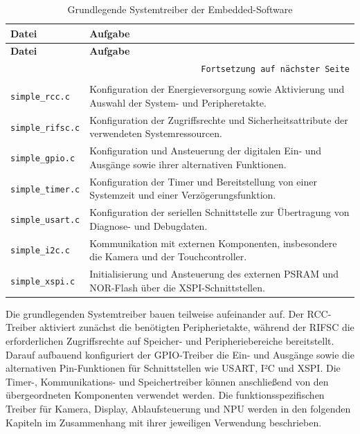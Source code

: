 \begin{longtable}{|p{}|p{}|}
    \hline
    \textbf{Datei} & \textbf{Aufgabe} \\
    \hline
    \endfirsthead
    \hline
    \textbf{Datei} & \textbf{Aufgabe} \\
    \hline
    \endhead
    \hline
    \multicolumn{2}{r}{\texttt{Fortsetzung auf nächster Seite}} \\
    \endfoot
    \caption{Grundlegende Systemtreiber der Embedded-Software}
    \label{tab:systemtreiber} \\
    \endlastfoot
    \texttt{simple\_rcc.c}   & Konfiguration der Energieversorgung sowie Aktivierung und Auswahl der System- und Peripheretakte. \\
    \hline
    \texttt{simple\_rifsc.c} & Konfiguration der Zugriffsrechte und Sicherheitsattribute der verwendeten Systemressourcen. \\
    \hline
    \texttt{simple\_gpio.c}  & Konfiguration und Ansteuerung der digitalen Ein- und Ausgänge sowie ihrer alternativen Funktionen. \\
    \hline
    \texttt{simple\_timer.c} & Konfiguration der Timer und Bereitstellung von einer Systemzeit und einer Verzögerungsfunktion. \\
    \hline
    \texttt{simple\_usart.c} & Konfiguration der seriellen Schnittstelle zur Übertragung von Diagnose- und Debugdaten. \\
    \hline
    \texttt{simple\_i2c.c}   & Kommunikation mit externen Komponenten, insbesondere die Kamera und der Touchcontroller. \\
    \hline
    \texttt{simple\_xspi.c}  & Initialisierung und Ansteuerung des externen PSRAM und NOR-Flash über die XSPI-Schnittstellen. \\
    \hline
\end{longtable}

Die grundlegenden Systemtreiber bauen teilweise aufeinander auf. Der RCC-Treiber aktiviert zunächst die benötigten Peripherietakte, während der RIFSC die erforderlichen Zugriffsrechte auf Speicher- und Peripheriebereiche bereitstellt. Darauf aufbauend konfiguriert der GPIO-Treiber die Ein- und Ausgänge sowie die alternativen Pin-Funktionen für Schnittstellen wie USART, I²C und XSPI. Die Timer-, Kommunikations- und Speichertreiber können anschließend von den übergeordneten Komponenten verwendet werden. Die funktionsspezifischen Treiber für Kamera, Display, Ablaufsteuerung und NPU werden in den folgenden Kapiteln im Zusammenhang mit ihrer jeweiligen Verwendung beschrieben.


